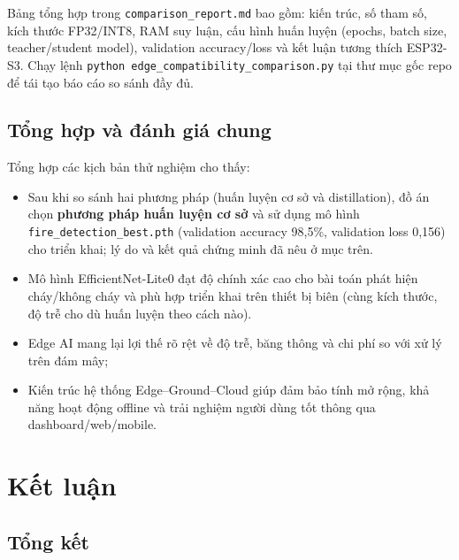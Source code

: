 \documentclass[12pt,a4paper]{report}
\begin{document}
Bảng tổng hợp trong \texttt{comparison\_report.md} bao gồm: kiến trúc, số tham số, kích thước FP32/INT8, RAM suy luận, cấu hình huấn luyện (epochs, batch size, teacher/student model), validation accuracy/loss và kết luận tương thích ESP32-S3. Chạy lệnh \texttt{python edge\_compatibility\_comparison.py} tại thư mục gốc repo để tái tạo báo cáo so sánh đầy đủ.

\section{Tổng hợp và đánh giá chung}

Tổng hợp các kịch bản thử nghiệm cho thấy:
\begin{itemize}
  \item Sau khi so sánh hai phương pháp (huấn luyện cơ sở và distillation), đồ án chọn \textbf{phương pháp huấn luyện cơ sở} và sử dụng mô hình \texttt{fire\_detection\_best.pth} (validation accuracy 98{,}5\%, validation loss 0{,}156) cho triển khai; lý do và kết quả chứng minh đã nêu ở mục trên.
  \item Mô hình EfficientNet-Lite0 đạt độ chính xác cao cho bài toán phát hiện cháy/không cháy và phù hợp triển khai trên thiết bị biên (cùng kích thước, độ trễ cho dù huấn luyện theo cách nào).
  \item Edge AI mang lại lợi thế rõ rệt về độ trễ, băng thông và chi phí so với xử lý trên đám mây;
  \item Kiến trúc hệ thống Edge--Ground--Cloud giúp đảm bảo tính mở rộng, khả năng hoạt động offline và trải nghiệm người dùng tốt thông qua dashboard/web/mobile.
\end{itemize}

\chapter{Kết luận}

\section{Tổng kết}
\end{document}
